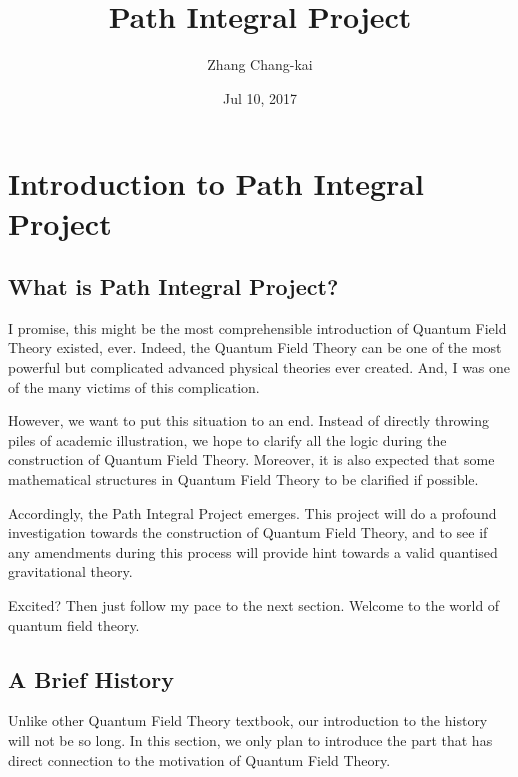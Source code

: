 \documentclass[letterpaper,10pt,english]{sphinxmanual}
\title{Path Integral Project}
\date{Jul 10, 2017}
\author{Zhang Chang-kai}
\begin{document}
\maketitle
\sphinxtableofcontents
{}\label{\detokenize{index::doc}}



\chapter{Introduction to Path Integral Project}
\label{\detokenize{intro:introduction-to-path-integral-project}}\label{\detokenize{intro:path-integral-project}}\label{\detokenize{intro::doc}}

\section{What is Path Integral Project?}
\label{\detokenize{intro_what:what-is-path-integral-project}}\label{\detokenize{intro_what::doc}}
I promise, this might be the most comprehensible introduction of Quantum Field Theory existed, ever. Indeed, the Quantum Field Theory can be one of the most powerful but complicated advanced physical theories ever created. And, I was one of the many victims of this complication.

However, we want to put this situation to an end. Instead of directly throwing piles of academic illustration, we hope to clarify all the logic during the construction of Quantum Field Theory. Moreover, it is also expected that some mathematical structures in Quantum Field Theory to be clarified if possible.

Accordingly, the Path Integral Project emerges. This project will do a profound investigation towards the construction of Quantum Field Theory, and to see if any amendments during this process will provide hint towards a valid quantised gravitational theory.

Excited? Then just follow my pace to the next section. Welcome to the world of quantum field theory.


\section{A Brief History}
\label{\detokenize{intro_history:a-brief-history}}\label{\detokenize{intro_history::doc}}
Unlike other Quantum Field Theory textbook, our introduction to the history will not be so long. In this section, we only plan to introduce the part that has direct connection to the motivation of Quantum Field Theory.
\end{document}
